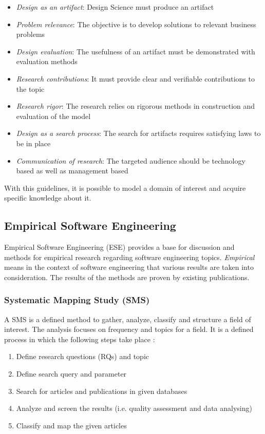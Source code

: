 \begin{itemize}
    \item \textit{Design as an artifact}: Design Science must produce an artifact
    \item \textit{Problem relevance}: The objective is to develop solutions to relevant business problems
    \item \textit{Design evaluation}: The usefulness of an artifact must be demonstrated with evaluation methods
    \item \textit{Research contributions}: It must provide clear and verifiable contributions to the topic
    \item \textit{Research rigor}: The research relies on rigorous methods in construction and evaluation of the model
    \item \textit{Design as a search process}: The search for artifacts requires satisfying laws to be in place
    \item \textit{Communication of research}: The targeted audience should be technology based as well as management based
\end{itemize}

With this guidelines, it is possible to model a domain of interest and acquire
specific knowledge about it.

\subsection{Empirical Software Engineering}

Empirical Software Engineering (ESE) provides a base for discussion and methods for empirical
research regarding software engineering topics. \textit{Empirical} means in the context
of software engineering that various results are taken into consideration. The results
of the methods are proven by existing publications.

\subsubsection{Systematic Mapping Study (SMS)}

A SMS is a defined method to gather, analyze, classify and structure a field of interest.
The analysis focuses on frequency and topics for a
field. It is a defined process in which the following steps take place \cite{petersen:SMS}:

\begin{enumerate}
    \item Define research questions (RQs) and topic
    \item Define search query and parameter
    \item Search for articles and publications in given databases
    \item Analyze and screen the results (i.e. quality assessment and data analysing)
    \item Classify and map the given articles
\end{enumerate}

